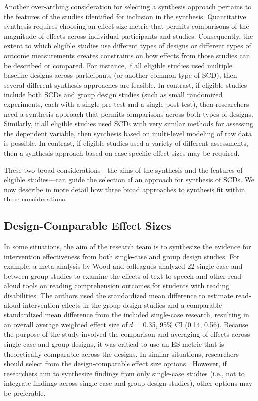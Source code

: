 \documentclass[
]{book}
\begin{document}
Another over-arching consideration for selecting a synthesis approach pertains to the features of the studies identified for inclusion in the synthesis.
Quantitative synthesis requires choosing an effect size metric that permits comparisons of the magnitude of effects across individual participants and studies.
Consequently, the extent to which eligible studies use different types of designs or different types of outcome measurements creates constraints on how effects from those studies can be described or compared.
For instance, if all eligible studies used multiple baseline designs across participants (or another common type of SCD), then several different synthesis approaches are feasible.
In contrast, if eligible studies include both SCDs and group design studies (such as small randomized experiments, each with a single pre-test and a single post-test), then researchers need a synthesis approach that permits comparisons across both types of designs.
Similarly, if all eligible studies used SCDs with very similar methods for assessing the dependent variable, then synthesis based on multi-level modeling of raw data is possible.
In contrast, if eligible studies used a variety of different assessments, then a synthesis approach based on case-specific effect sizes may be required.

These two broad considerations---the aims of the synthesis and the features of eligible studies---can guide the selection of an approach for synthesis of SCDs.
We now describe in more detail how three broad approaches to synthesis fit within these considerations.

\hypertarget{design-comparable-effect-sizes}{%
\subsection{Design-Comparable Effect Sizes}\label{design-comparable-effect-sizes}}

In some situations, the aim of the research team is to synthesize the evidence for intervention effectiveness from both single-case and group design studies.
For example, a meta-analysis by Wood and colleagues \citeyearpar{wood2018Does} analyzed 22 single-case and between-group studies to examine the effects of text-to-speech and other read-aloud tools on reading comprehension outcomes for students with reading disabilities.
The authors used the standardized mean difference to estimate read-aloud intervention effects in the group design studies and a comparable standardized mean difference from the included single-case research, resulting in an overall average weighted effect size of \(d\) = 0.35, 95\% CI (0.14, 0.56).
Because the purpose of the \citet{wood2018Does} study involved the comparison and averaging of effects across single-case and group designs, it was critical to use an ES metric that is theoretically comparable across the designs.
In similar situations, researchers should select from the design-comparable effect size options \citep{Hedges2012ABk, Hedges2012MB, Pustejovsky2014design, Shadish2013d, Swaminathan2014effect, VandenNoortgate2008multilevel}.
However, if researchers aim to synthesize findings from only single-case studies (i.e., not to integrate findings across single-case and group design studies), other options may be preferable.
\end{document}
